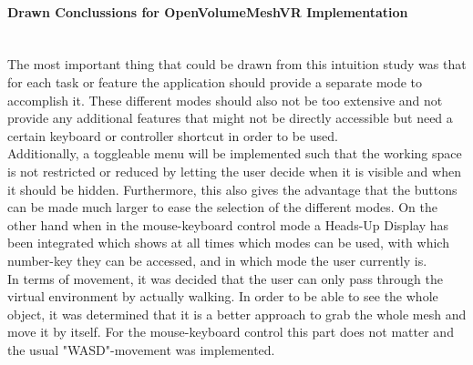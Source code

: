 \documentclass{report}
\begin{document}
			\paragraph{Drawn Conclussions for OpenVolumeMeshVR Implementation} \hfill \\
			The most important thing that could be drawn from this intuition study was that for each task or feature the application should provide a separate mode to accomplish it. These different modes should also not be too extensive and not provide any additional features that might not be directly accessible but need a certain keyboard or controller shortcut in order to be used. \\
			Additionally, a toggleable menu will be implemented such that the working space is not restricted or reduced by letting the user decide when it is visible and when it should be hidden. Furthermore, this also gives the advantage that the buttons can be made much larger to ease the selection of the different modes. On the other hand when in the mouse-keyboard control mode a Heads-Up Display has been integrated which shows at all times which modes can be used, with which number-key they can be accessed, and in which mode the user currently is.  \\
			In terms of movement, it was decided that the user can only pass through the virtual environment by actually walking. In order to be able to see the whole object, it was determined that it is a better approach to grab the whole mesh and move it by itself. For the mouse-keyboard control this part does not matter and the usual "WASD"-movement was implemented.			
		\closesection
	\closesection
		
		
\end{document}
